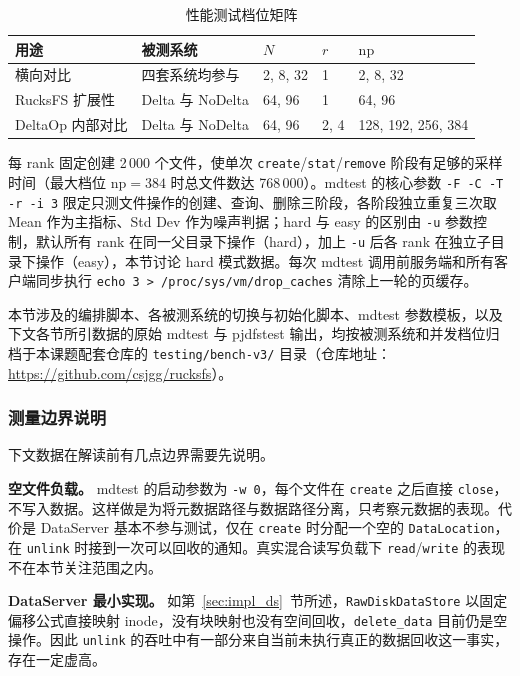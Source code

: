 \begin{table}[htbp]
    \centering
    \caption{性能测试档位矩阵}
    \label{tab:bench-matrix}
    \small
    \begin{tabular}{lllll}
        \toprule
        用途 & 被测系统 & $N$ & $r$ & $\mathrm{np}$ \\
        \midrule
        横向对比          & 四套系统均参与         & 2, 8, 32        & 1      & 2, 8, 32 \\
        RucksFS 扩展性    & Delta 与 NoDelta    & 64, 96          & 1      & 64, 96 \\
        DeltaOp 内部对比  & Delta 与 NoDelta    & 64, 96          & 2, 4   & 128, 192, 256, 384 \\
        \bottomrule
    \end{tabular}
\end{table}

每 rank 固定创建 2\,000 个文件，使单次 \texttt{create}/\texttt{stat}/\texttt{remove} 阶段有足够的采样时间（最大档位 $\mathrm{np}=384$ 时总文件数达 768\,000）。mdtest 的核心参数 \texttt{-F -C -T -r -i 3} 限定只测文件操作的创建、查询、删除三阶段，各阶段独立重复三次取 Mean 作为主指标、Std Dev 作为噪声判据；hard 与 easy 的区别由 \texttt{-u} 参数控制，默认所有 rank 在同一父目录下操作（hard），加上 \texttt{-u} 后各 rank 在独立子目录下操作（easy），本节讨论 hard 模式数据。每次 mdtest 调用前服务端和所有客户端同步执行 \texttt{echo 3 > /proc/sys/vm/drop\_caches} 清除上一轮的页缓存。

本节涉及的编排脚本、各被测系统的切换与初始化脚本、mdtest 参数模板，以及下文各节所引数据的原始 mdtest 与 pjdfstest 输出，均按被测系统和并发档位归档于本课题配套仓库的 \texttt{testing/bench-v3/} 目录（仓库地址：\url{https://github.com/csjgg/rucksfs}）。

\subsubsection{测量边界说明}

下文数据在解读前有几点边界需要先说明。

\textbf{空文件负载。} mdtest 的启动参数为 \texttt{-w 0}，每个文件在 \texttt{create} 之后直接 \texttt{close}，不写入数据。这样做是为将元数据路径与数据路径分离，只考察元数据的表现。代价是 DataServer 基本不参与测试，仅在 \texttt{create} 时分配一个空的 \texttt{DataLocation}，在 \texttt{unlink} 时接到一次可以回收的通知。真实混合读写负载下 \texttt{read}/\texttt{write} 的表现不在本节关注范围之内。

\textbf{DataServer 最小实现。} 如第~\ref{sec:impl_ds}~节所述，\texttt{RawDiskDataStore} 以固定偏移公式直接映射 inode，没有块映射也没有空间回收，\texttt{delete\_data} 目前仍是空操作。因此 \texttt{unlink} 的吞吐中有一部分来自当前未执行真正的数据回收这一事实，存在一定虚高。

